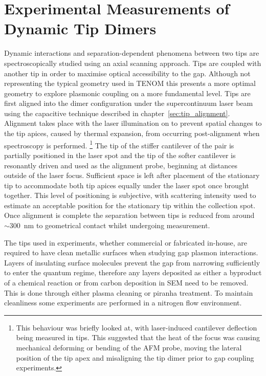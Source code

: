 \documentclass[a4paper]{article}
\begin{document}
\section{Experimental Measurements of Dynamic Tip Dimers}

Dynamic interactions and separation-dependent phenomena between two tips are spectroscopically studied using an axial scanning approach. Tips are coupled with another tip in order to maximise optical accessibility to the gap. Although not representing the typical geometry used in TENOM this presents a more optimal geometry to explore plasmonic coupling on a more fundamental level.
Tips are first aligned into the dimer configuration under the supercontinuum laser beam using the capacitive technique described in chapter~\ref{sec:tip_alignment}. Alignment takes place with the laser illumination on to prevent spatial changes to the tip apices, caused by thermal expansion, from occurring post-alignment when spectroscopy is performed.%
\footnote{This behaviour was briefly looked at, with laser-induced cantilever deflection being measured in tips. This suggested that the heat of the focus was causing mechanical deforming or bending of the AFM probe, moving the lateral position of the tip apex and misaligning the tip dimer prior to gap coupling experiments.}
The tip of the stiffer cantilever of the pair is partially positioned in the laser spot and the tip of the softer cantilever is resonantly driven and used as the alignment probe, beginning at distances outside of the laser focus. Sufficient space is left after placement of the stationary tip to accommodate both tip apices equally under the laser spot once brought together. This level of positioning is subjective, with scattering intensity used to estimate an acceptable position for the stationary tip within the collection spot. Once alignment is complete the separation between tips is reduced from around $\sim$\SI{300}{nm} to geometrical contact whilst undergoing measurement.

The tips used in experiments, whether commercial or fabricated in-house, are required to have clean metallic surfaces when studying gap plasmon interactions. Layers of insulating surface molecules prevent the gap from narrowing sufficiently to enter the quantum regime, therefore any layers deposited as either a byproduct of a chemical reaction or from carbon deposition in SEM need to be removed. This is done through either plasma cleaning or piranha treatment. To maintain cleanliness some experiments are performed in a nitrogen flow environment.
\end{document}
